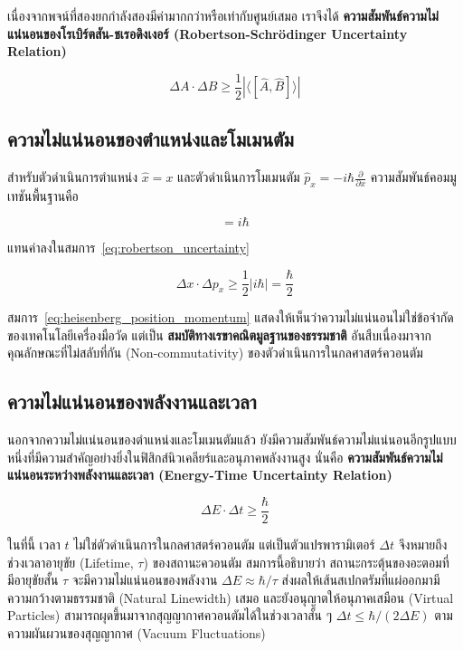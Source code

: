 เนื่องจากพจน์ที่สองยกกำลังสองมีค่ามากกว่าหรือเท่ากับศูนย์เสมอ เราจึงได้ \textbf{ความสัมพันธ์ความไม่แน่นอนของโรเบิร์ตสัน-ชเรอดิงเงอร์ (Robertson-Schr{\"o}dinger Uncertainty Relation)}

\begin{equation}
\Delta A \cdot \Delta B \ge \frac{1}{2}|\langle [\hat{A}, \hat{B}] \rangle|
\label{eq:robertson_uncertainty}
\end{equation}

\subsection{ความไม่แน่นอนของตำแหน่งและโมเมนตัม}

สำหรับตัวดำเนินการตำแหน่ง $\hat{x} = x$ และตัวดำเนินการโมเมนตัม $\hat{p}_x = -i\hbar\frac{\partial}{\partial x}$ ความสัมพันธ์คอมมูเทชันพื้นฐานคือ

\begin{equation}
[\hat{x}, \hat{p}_x] = i\hbar
\label{eq:canonical_commutation}
\end{equation}

แทนค่าลงในสมการ~\eqref{eq:robertson_uncertainty}

\begin{equation}
\Delta x \cdot \Delta p_x \ge \frac{1}{2}|i\hbar| = \frac{\hbar}{2}
\label{eq:heisenberg_position_momentum}
\end{equation}

สมการ~\eqref{eq:heisenberg_position_momentum} แสดงให้เห็นว่าความไม่แน่นอนไม่ใช่ข้อจำกัดของเทคโนโลยีเครื่องมือวัด แต่เป็น \textbf{สมบัติทางเรขาคณิตมูลฐานของธรรมชาติ} อันสืบเนื่องมาจากคุณลักษณะที่ไม่สลับที่กัน (Non-commutativity) ของตัวดำเนินการในกลศาสตร์ควอนตัม

\subsection{ความไม่แน่นอนของพลังงานและเวลา}

นอกจากความไม่แน่นอนของตำแหน่งและโมเมนตัมแล้ว ยังมีความสัมพันธ์ความไม่แน่นอนอีกรูปแบบหนึ่งที่มีความสำคัญอย่างยิ่งในฟิสิกส์นิวเคลียร์และอนุภาคพลังงานสูง นั่นคือ \textbf{ความสัมพันธ์ความไม่แน่นอนระหว่างพลังงานและเวลา (Energy-Time Uncertainty Relation)}

\begin{equation}
\Delta E \cdot \Delta t \ge \frac{\hbar}{2}
\label{eq:energy_time_uncertainty}
\end{equation}

ในที่นี้ เวลา $t$ ไม่ใช่ตัวดำเนินการในกลศาสตร์ควอนตัม แต่เป็นตัวแปรพารามิเตอร์ $\Delta t$ จึงหมายถึงช่วงเวลาอายุขัย (Lifetime, $\tau$) ของสถานะควอนตัม สมการนี้อธิบายว่า สถานะกระตุ้นของอะตอมที่มีอายุขัยสั้น $\tau$ จะมีความไม่แน่นอนของพลังงาน $\Delta E \approx \hbar/\tau$ ส่งผลให้เส้นสเปกตรัมที่แผ่ออกมามีความกว้างตามธรรมชาติ (Natural Linewidth) เสมอ และยังอนุญาตให้อนุภาคเสมือน (Virtual Particles) สามารถผุดขึ้นมาจากสุญญากาศควอนตัมได้ในช่วงเวลาสั้น ๆ $\Delta t \le \hbar/(2\Delta E)$ ตามความผันผวนของสุญญากาศ (Vacuum Fluctuations)

